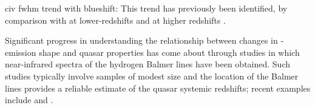 civ fwhm trend with blueshift: This trend has previously been identified, by comparison with  at lower-redshifts \citep{shen08,shen11} and \hb at higher redshifts \citep{shen12}.


Significant progress in understanding the relationship between changes in -emission shape and quasar properties has come about through studies in which near-infrared spectra of the hydrogen Balmer lines have been obtained. 
Such studies typically involve samples of modest size and the location of the Balmer lines provides a reliable estimate of the quasar systemic redshifts; recent examples include \citet{shen12} and \citet{marziani16}. 